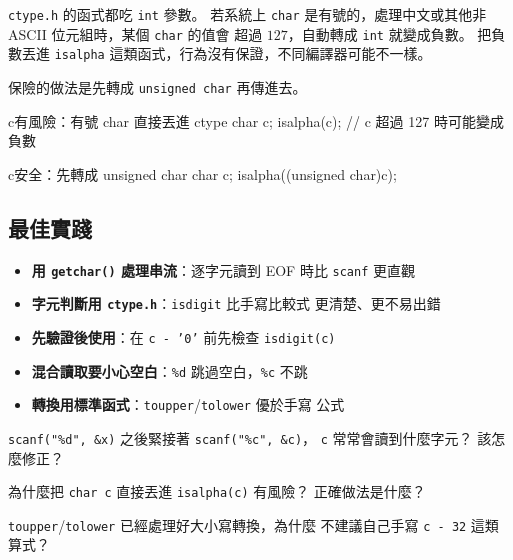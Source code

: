 \texttt{ctype.h} 的函式都吃 \texttt{int} 參數。 若系統上 \texttt{char}
是有號的，處理中文或其他非 ASCII 位元組時，某個 \texttt{char} 的值會
超過 $127$，自動轉成 \texttt{int} 就變成負數。 把負數丟進
\texttt{isalpha} 這類函式，行為沒有保證，不同編譯器可能不一樣。

保險的做法是先轉成 \texttt{unsigned char} 再傳進去。

\begin{code}{c}{有風險：有號 char 直接丟進 ctype}
char c;
isalpha(c);   // c 超過 127 時可能變成負數
\end{code}

\begin{code}{c}{安全：先轉成 unsigned char}
char c;
isalpha((unsigned char)c);
\end{code}

\subsection{最佳實踐}

\begin{itemize}
\item \textbf{用 \texttt{getchar()} 處理串流}：逐字元讀到 EOF 時比
\texttt{scanf} 更直觀
\item \textbf{字元判斷用 \texttt{ctype.h}}：\texttt{isdigit} 比手寫比較式
更清楚、更不易出錯
\item \textbf{先驗證後使用}：在 \texttt{c - '0'} 前先檢查 \texttt{isdigit(c)}
\item \textbf{混合讀取要小心空白}：\texttt{\%d} 跳過空白，\texttt{\%c} 不跳
\item \textbf{轉換用標準函式}：\texttt{toupper}/\texttt{tolower} 優於手寫
公式
\end{itemize}


\begin{drills}[label=drills:char-pitfalls]
\item \texttt{scanf("\%d", \&x)} 之後緊接著 \texttt{scanf("\%c", \&c)}，
\texttt{c} 常常會讀到什麼字元？ 該怎麼修正？
\item 為什麼把 \texttt{char c} 直接丟進 \texttt{isalpha(c)} 有風險？
正確做法是什麼？
\item \texttt{toupper}/\texttt{tolower} 已經處理好大小寫轉換，為什麼
不建議自己手寫 \texttt{c - 32} 這類算式？
\end{drills}

